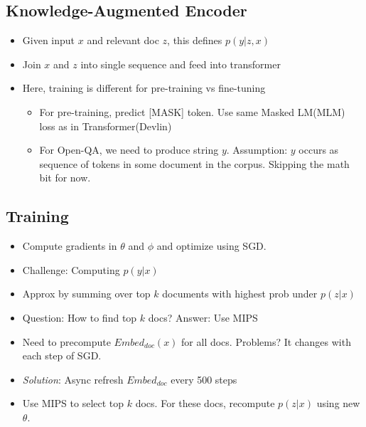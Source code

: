 \documentclass[a4paper]{article}
\begin{document}
\subsection{Knowledge-Augmented Encoder}
\begin{itemize}
    \item Given input  $x$ and relevant doc $z$, this defines  $p(y|z,x)$
    \item Join $x$ and $z$ into single sequence and feed into transformer
    \item Here, training is different for pre-training vs fine-tuning
    \begin{itemize}
        \item For pre-training, predict [MASK] token. Use same Masked LM(MLM) loss as in Transformer(Devlin)
        \item For Open-QA, we need to produce string $y$. Assumption: $y$ occurs as sequence of tokens in some document in the corpus. Skipping the math bit for now.
    \end{itemize}
\end{itemize}
\subsection{Training}
\begin{itemize}
    \item Compute gradients in $\theta$ and $\phi$ and optimize using SGD.
    \item Challenge: Computing $p(y|x)$
    \item Approx by summing over top $k$ documents with highest prob under $p(z|x)$
    \item Question: How to find top $k$ docs? Answer: Use MIPS
    \item Need to precompute $Embed_{doc}(x)$ for all docs. Problems? It changes with each step of SGD.
    \item \textit{Solution}: Async refresh $Embed_{doc}$ every 500 steps
    \item Use MIPS to select top $k$ docs. For these docs, recompute $p(z|x)$ using new $\theta$.
\end{itemize}
\end{document}
